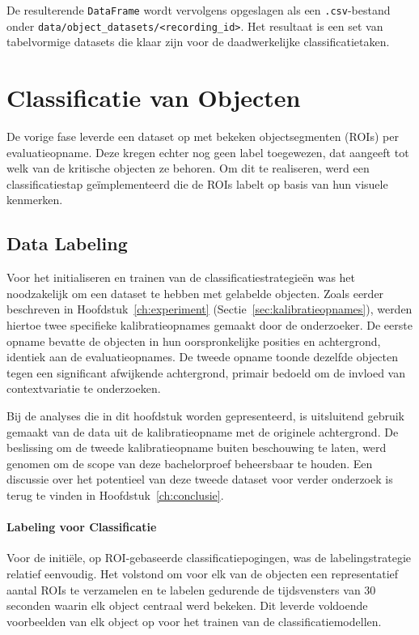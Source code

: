 De resulterende \texttt{DataFrame} wordt vervolgens opgeslagen 
als een \texttt{.csv}-bestand onder \texttt{data/object\_datasets/<recording\_id>}. 
Het resultaat is een set van tabelvormige datasets die klaar zijn voor de daadwerkelijke classificatietaken.

\section{Classificatie van Objecten}

De vorige fase leverde een dataset op met bekeken objectsegmenten (ROIs) per evaluatieopname.
Deze kregen echter nog geen label toegewezen, dat aangeeft tot welk van de kritische objecten ze behoren.
Om dit te realiseren, werd een classificatiestap geïmplementeerd die de ROIs labelt op basis van hun visuele kenmerken.

\subsection{Data Labeling}

Voor het initialiseren en trainen van de classificatiestrategieën was het noodzakelijk om een dataset te hebben met gelabelde objecten.
Zoals eerder beschreven in Hoofdstuk~\ref{ch:experiment} (Sectie~\ref{sec:kalibratieopnames}), werden hiertoe 
twee specifieke kalibratieopnames gemaakt door de onderzoeker.
De eerste opname bevatte de objecten in hun oorspronkelijke posities en achtergrond, identiek aan de evaluatieopnames.
De tweede opname toonde dezelfde objecten tegen een significant afwijkende achtergrond, 
primair bedoeld om de invloed van contextvariatie te onderzoeken.

Bij de analyses die in dit hoofdstuk worden gepresenteerd, is uitsluitend gebruik gemaakt 
van de data uit de kalibratieopname met de originele achtergrond.
De beslissing om de tweede kalibratieopname buiten beschouwing te laten, werd genomen om de scope van deze bachelorproef beheersbaar te houden.
Een discussie over het potentieel van deze tweede dataset voor verder onderzoek is terug te vinden in Hoofdstuk~\ref{ch:conclusie}.

\paragraph{Labeling voor Classificatie}
Voor de initiële, op ROI-gebaseerde classificatiepogingen, was de labelingstrategie relatief eenvoudig.
Het volstond om voor elk van de objecten een representatief aantal ROIs te verzamelen en te labelen gedurende de 
tijdsvensters van 30 seconden waarin elk object centraal werd bekeken. 
Dit leverde voldoende voorbeelden van elk object op voor het trainen van de classificatiemodellen.

